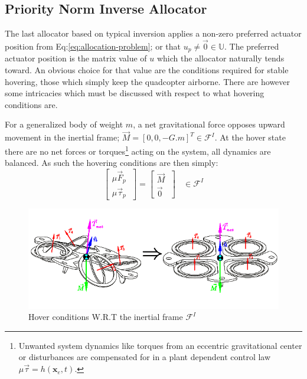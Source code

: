 \subsection{Priority Norm Inverse Allocator}
\label{subsec:control.allocation.norminverse}
The last allocator based on typical inversion applies a non-zero preferred actuator position from Eq:\ref{eq:allocation-problem}; or that $u_p\not=\vec{0}\in\mathbb{U}$. The preferred actuator position is the matrix value of $u$ which the allocator naturally tends toward. An obvious choice for that value are the conditions required for stable hovering, those which simply keep the quadcopter airborne. There are however some intricacies which must be discussed with respect to what hovering conditions are.
\par
For a generalized body of weight $m$, a net gravitational force opposes upward movement in the inertial frame; $\vec{M}=[0, 0, -G.m]^T\in\mathcal{F}^I$. At the hover state there are no net forces or torques\footnote{Unwanted system dynamics like torques from an eccentric gravitational center or disturbances are compensated for in a plant dependent control law $\mu\vec{\tau}=h(\mathbf{x}_e,t)$.} acting on the system, all dynamics are balanced. As such the hovering conditions are then simply:
\begin{equation}\label{eq:hover}
\begin{bmatrix}
\mu\vec{F}_p\hspace{3pt}\\
\mu\vec{\tau}_p\hspace{3pt}
\end{bmatrix}
=
\begin{bmatrix}
\vec{M}\hspace{3pt}\\
\vec{0}\hspace{3pt}
\end{bmatrix}~~~~\in\mathcal{F}^I
\end{equation}
\par
\begin{figure}[htbp]
\centering
\includegraphics[width=\textwidth]{figs/hover-inertial}
\caption{Hover conditions W.R.T the inertial frame $\mathcal{F}^I$}
\label{fig:hover-inertial}
\end{figure}
